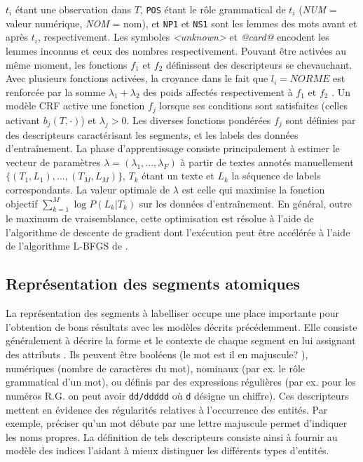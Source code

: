 $t_i$ étant une observation dans $T$, \verb|POS| étant le rôle grammatical de $t_i$ (\textit{NUM} = valeur numérique, \textit{NOM} = nom), et \verb|NP1| et \verb|NS1| sont les lemmes des mots avant et après $t_i$, respectivement. Les symboles \textit{<unknown>} et \textit{@card@} encodent les lemmes inconnus et ceux des nombres respectivement. Pouvant être activées au même moment, les fonctions $f_1$ et $f_2$ définissent des descripteurs se chevauchant. Avec plusieurs fonctions activées, la croyance dans le fait que $l_i = NORME$ est renforcée par la somme $\lambda_1 + \lambda_2$ des poids affectés respectivement à $f_1$ et $f_2$ \citep{Zhu2010CRFlecture}.  Un modèle CRF active une fonction $f_j$ lorsque ses conditions sont satisfaites (celles activant $b_j(T,\cdot)$) et $\lambda_j > 0$. Les diverses fonctions pondérées $f_j$ sont définies par des descripteurs caractérisant les segments, et les labels des données d'entraînement. La phase d'apprentissage consiste principalement à estimer le vecteur de paramètres $\lambda = (\lambda_1,...,\lambda_F)$ à partir de textes annotés manuellement $ \lbrace (T_1, L_1), ..., (T_M, L_M) \rbrace $, $ T_k $ étant un texte et $ L_k $ la séquence de labels correspondants. La valeur optimale de $\lambda$ est celle qui maximise la fonction objectif   
$\sum\limits_ {k = 1} ^ M \log P (L_k \vert T_k) $ sur les données d'entraînement. En général, outre le maximum de vraisemblance, cette optimisation est résolue à l'aide de l'algorithme de descente de gradient dont l'exécution peut être accélérée à l'aide de l'algorithme L-BFGS de \citet{liu1989l-bfgs}.

\subsection{Représentation des segments atomiques}

La représentation des segments à labelliser occupe une place importante pour l'obtention de bons résultats avec les modèles décrits précédemment. Elle consiste généralement à décrire la forme et le contexte de chaque segment en lui assignant des attributs \citep{nadeau2007nersurvey,sharnagat2014nersurvey}. Ils peuvent être booléens (\og le mot est il en majuscule? \fg{}), numériques (nombre de caractères du mot), nominaux (par ex. le rôle grammatical d'un mot), ou définis par des expressions régulières (par ex. pour les numéros R.G. on peut avoir \verb|dd/ddddd| où \verb|d| désigne un chiffre). Ces descripteurs mettent  en évidence des régularités relatives à l'occurrence des entités. Par exemple, préciser qu'un mot débute par une lettre majuscule permet d'indiquer les noms propres. La définition de tels descripteurs consiste ainsi à fournir au modèle des indices l'aidant à mieux distinguer les différents types d'entités. 

